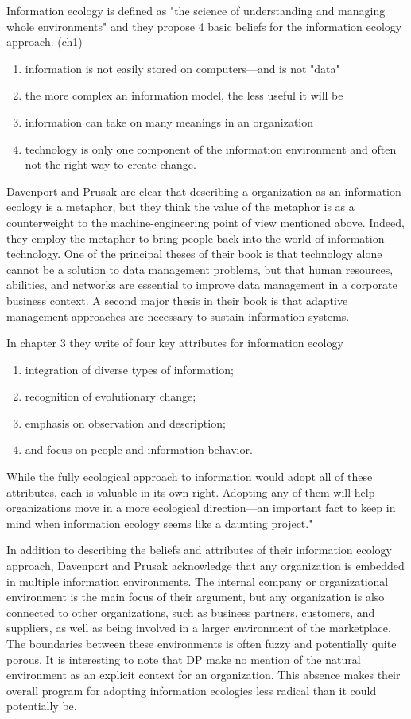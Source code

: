 Information ecology is defined as "the science of understanding and managing whole environments" and they propose 4 basic beliefs for the information ecology approach. (ch1)
\begin{enumerate}
\item information is not easily stored on computers—and is not "data"
\item the more complex an information model, the less useful it will be
\item information can take on many meanings in an organization
\item technology is only one component of the information environment and often not the right way to create change.
\end{enumerate}

Davenport and Prusak are clear that describing a organization as an information ecology is a metaphor, but they think the value of the metaphor is as a counterweight to the machine-engineering point of view mentioned above. Indeed, they employ the metaphor to bring people back into the world of information technology. One of the principal theses of their book is that technology alone cannot be a solution to data management problems, but that human resources, abilities, and networks are essential to improve data management in a corporate business context. A second major thesis in their book is that adaptive management approaches are necessary to sustain information systems.

In chapter 3 they write of four key attributes for information ecology

\begin{enumerate}
\item integration of diverse types of information;
\item recognition of evolutionary change;
\item emphasis on observation and description;
\item and focus on people and information behavior.
\end{enumerate}
While the fully ecological approach to information would adopt all of these attributes, each is valuable in its own right. Adopting any of them will help organizations move in a more ecological direction—an important fact to keep in mind when information ecology seems like a daunting project."

In addition to describing the beliefs and attributes of their information ecology approach, Davenport and Prusak acknowledge that any organization is embedded in multiple information environments. The internal company or organizational environment is the main focus of their argument, but any organization is also connected to other organizations, such as business partners, customers, and suppliers, as well as being involved in a larger environment of the marketplace. The boundaries between these environments is often fuzzy and potentially quite porous. It is interesting to note that DP make no mention of the natural environment as an explicit context for an organization. This absence makes their overall program for adopting information ecologies less radical than it could potentially be.

